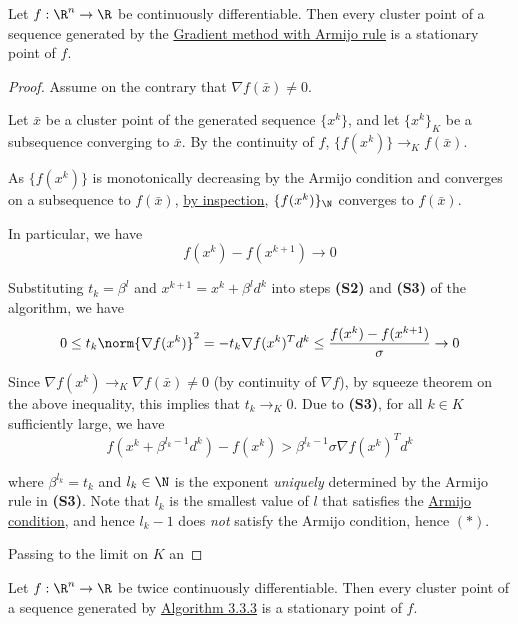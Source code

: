\label{bbb25cd}

Let $f:\R^n\to\R$ be continuously differentiable. Then every cluster
point of a sequence generated by the \hyperref[ae01f6d]{Gradient
	method with Armijo rule} is a stationary point of $f$.

\begin{proof}
	\def\xk{\{x^k\}}
	\def\grad#1{\nabla f(#1)}
	Assume on the contrary that $\grad{\bar x}\neq0$.

	Let $\bar x$ be a cluster point of the generated sequence $\xk$, and
	let $\xk_K$ be a subsequence converging to $\bar x$. By the
	continuity of $f$, $\{f(x^k)\}\to_Kf(\bar x)$.

	As $\{f(x^k)\}$ is monotonically decreasing by the Armijo condition
	and converges on a subsequence to $f(\bar x)$, \hyperref[aaf3ba6]{by
		inspection}, $\{f(x^k)\}_\N$ converges to $f(\bar x)$.

	In particular, we have
	$$f(x^k)-f(x^{k+1})\to0$$

	Substituting $t_k=\beta^l$ and $x^{k+1}=x^k+\beta^ld^k$ into steps
	\textbf{(S2)} and \textbf{(S3)} of the algorithm, we have
	$$
		0\leq
		t_k\norm{\grad{x^k}}^2=
		-t_k\grad{x^k}^Td^k\leq
		\frac{f(x^k)-f(x^{k+1})}\sigma\to0
	$$

	Since $\grad{x^k}\to_K\grad{\bar x}\neq0$ (by continuity of $\nabla
		f$), by squeeze theorem on the above inequality, this implies that
	$t_k\to_K0$. Due to \textbf{(S3)}, for all $k\in K$ sufficiently
	large, we have
	\begin{equation*}
		f(x^k+\beta^{l_k-1}d^k)-f(x^k)>\beta^{l_k-1}\sigma\grad{x^k}^Td^k\tag*{($*$)}
	\end{equation*}

	where $\beta^{l_k}=t_k$ and $l_k\in\N$ is the exponent
	\textit{uniquely} determined by the Armijo rule in \textbf{(S3)}.
	Note that $l_k$ is the smallest value of $l$ that satisfies the
	\hyperref[fefb024]{Armijo condition}, and hence $l_k-1$ does \textit{not}
	satisfy the Armijo condition, hence $(*)$.

	Passing to the limit on $K$ an
\end{proof}


Let $f:\R^n\to\R$ be twice continuously differentiable. Then every
cluster point of a sequence generated by \hyperref[a7a5665]{Algorithm
	3.3.3} is a stationary point of $f$.

